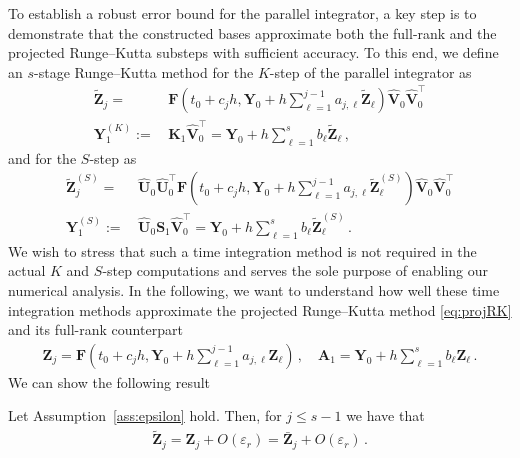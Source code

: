 \documentclass[preprint,runningheads]{svjour3}
\newcommand\bfA{{\mathbf A}}
\newcommand\bfF{{\mathbf F}}
\newcommand\bfK{{\mathbf K}}
\newcommand\bfS{{\mathbf S}}
\newcommand\bfU{{\mathbf U}}
\newcommand\bfV{{\mathbf V}}
\newcommand\bfY{{\mathbf Y}}
\newcommand\bfZ{{\mathbf Z}}
\begin{document}
To establish a robust error bound for the parallel integrator, a key step is to demonstrate that the constructed bases approximate both the full-rank and the projected Runge--Kutta substeps with sufficient accuracy. To this end, we define an $s$-stage Runge–Kutta method for the $K$-step of the parallel integrator as
\begin{subequations}\label{eq:RK-Kstep}
    \begin{align}
    \widetilde \bfZ_{j} =\,& \bfF(t_0 + c_{j}h, \bfY_0 + h\sum_{\ell = 1}^{j-1}a_{j,\ell}\widetilde \bfZ_{\ell})\widehat \bfV_0\widehat \bfV_0^{\top} \\
    \bfY_1^{(K)} :=\,& \bfK_1\widehat \bfV_0^{\top} = \bfY_0 + h\sum_{\ell = 1}^s b_{\ell}\widetilde \bfZ_{\ell}\,,
\end{align}
\end{subequations}
and for the $S$-step as
\begin{subequations}\label{eq:RK-Sstep}
    \begin{align}
    \widetilde \bfZ_{j}^{(S)} =\,& \widehat \bfU_0\widehat \bfU_0^{\top}\bfF(t_0 + c_{j}h, \bfY_0 + h\sum_{\ell = 1}^{j-1}a_{j,\ell}\widetilde \bfZ_{\ell}^{(S)})\widehat \bfV_0\widehat \bfV_0^{\top} \\
    \bfY_1^{(S)} :=\,& \widehat \bfU_0\bfS_1\widehat \bfV_0^{\top} = \bfY_0 + h\sum_{\ell = 1}^s b_{\ell}\widetilde \bfZ_{\ell}^{(S)}\,.
\end{align}
\end{subequations}
We wish to stress that such a time integration method is not required in the actual $K$ and $S$-step computations and serves the sole purpose of enabling our numerical analysis. In the following, we want to understand how well these time integration methods approximate the projected Runge--Kutta method \eqref{eq:projRK} and its full-rank counterpart
\begin{align*}
    \bfZ_{j} = \bfF(t_0 + c_{j}h, \bfY_0 + h\sum_{\ell = 1}^{j-1}a_{j,\ell}\bfZ_{\ell})\,,\quad \bfA_1 = \bfY_0 + h\sum_{\ell = 1}^s b_{\ell}\bfZ_{\ell}\,.
\end{align*}
We can show the following result
\begin{lemma}\label{le:rkstepsapprox}
Let Assumption~\ref{ass:epsilon} hold. Then, for $j\leq s-1$ we have that
    \begin{align}\label{eq:leRKclosenessS}
        \widetilde \bfZ_j = \bfZ_j + O(\varepsilon_r) = \bar \bfZ_j + O(\varepsilon_r)\,.
    \end{align}
\end{lemma}
\end{document}
